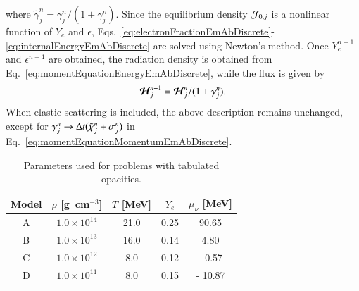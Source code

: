 \documentclass[11pt,letterpaper,twoside,english,final]{article}
\begin{document}
where $\tilde{\gamma}_{j}^{n}=\gamma_{j}^{n}/(1+\gamma_{j}^{n})$.  
Since the equilibrium density $\mathcal{J}_{0,j}$ is a nonlinear function of $Y_{e}$ and $\epsilon$, Eqs.~\eqref{eq:electronFractionEmAbDiscrete}-\eqref{eq:internalEnergyEmAbDiscrete} are solved using Newton's method.  
Once $Y_{e}^{n+1}$ and $\epsilon^{n+1}$ are obtained, the radiation density is obtained from Eq.~\eqref{eq:momentEquationEnergyEmAbDiscrete}, while the flux is given by
\begin{equation}
  \boldsymbol{\mathcal{H}}_{j}^{n+1}=\boldsymbol{\mathcal{H}}_{j}^{n}/(1+\gamma_{j}^{n}).  
  \label{eq:momentEquationMomentumEmAbDiscrete}
\end{equation}
When elastic scattering is included, the above description remains unchanged, except for $\gamma_{j}^{n}\to\Delta t\big(\tilde{\chi}_{j}^{n}+\sigma_{j}^{n}\big)$ in Eq.~\eqref{eq:momentEquationMomentumEmAbDiscrete}.  

\begin{table}[h]
  \caption{Parameters used for problems with tabulated opacities. \label{tab:tabulatedModels}}
  \small
  \vspace{-6pt}
  \begin{center}
  \begin{tabular}{ccccc}
    Model & $\rho$ [g~cm$^{-3}$] & $T$ [MeV] & $Y_{e}$ & $\mu_{\nu}$ [MeV] \\
    \midrule \midrule
    A & $1.0\times10^{14}$ & 21.0  & 0.25 &   90.65 \\
    B & $1.0\times10^{13}$ & 16.0 & 0.14 &     4.80 \\
    C & $1.0\times10^{12}$ &   8.0 & 0.12 & -   0.57 \\
    D & $1.0\times10^{11}$ &   8.0 & 0.15 & - 10.87 \\
    \midrule \midrule
  \end{tabular}
  \end{center}
\end{table}
\end{document}
